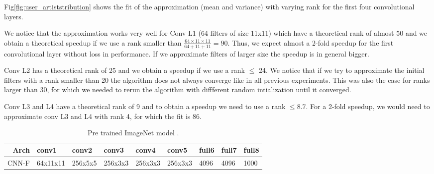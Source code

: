 Fig\ref{fig:user_artiststribution} shows the fit of the approximation (mean and variance) with varying rank for the first four convolutional layers.

We notice that the approximation works very well for Conv L1 (64 filters of size 11x11) which have a theoretical rank of almost 50 and we obtain a theoretical speedup if we use a rank smaller than $\frac{64\times 11\times 11}{64 + 11 + 11} = 90$. Thus, we expect almost a 2-fold speedup for the first convolutional layer without loss in performance. If we approximate filters of larger size the speedup is in general bigger. 

Conv L2 has a theoretical rank of 25 and we obtain a speedup if we use a rank $\leq$ 24. We notice that if we try to approximate the initial filters with a rank smaller than 20 the algorithm does not always converge like in all previous experiments. This was also the case for ranks larger than 30, for which we needed to rerun the algorithm with diffferent random intialization until it converged.

Conv L3 and L4 have a theoretical rank of 9 and to obtain a speedup we need to use a rank $\leq8.7$. For a 2-fold speedup, we would need to approximate conv L3 and L4 with rank 4, for which the fit is 86.

\begin{table}[h!]
\centering
\begin{tabular}{@{}rllllllll@{}}\toprule
Arch & conv1 & conv2&  conv3& conv4& conv5& full6& full7 &full8 \\ \midrule
CNN-F & 64x11x11 & 256x5x5& 256x3x3&256x3x3&256x3x3&4096&4096&1000\\
\end{tabular}
\caption{Pre trained ImageNet model  \cite{chatfield14return}.}
\label{fig:imagenet}
\end{table}


